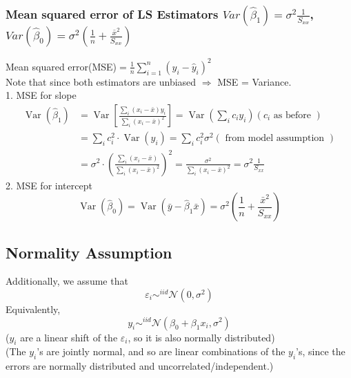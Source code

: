 \documentclass[11pt,a4paper]{article}
\begin{document}
\subsubsection{Mean squared error of LS Estimators $Var(\hat{\beta}_1)=\sigma^{2} \frac{1}{S_{x x}}$, $Var(\hat{\beta}_0)=\sigma^{2}\left(\frac{1}{n}+\frac{\bar{x}^{2}}{S_{x x}}\right)$}
Mean squared error(MSE)$= \frac{1}{n}\sum_{i=1}^n(y_i-\hat{y}_i)^2$\\
Note that since both estimators are unbiased $\Rightarrow$ MSE = Variance.\\
1. MSE for slope
\begin{equation}
    \begin{aligned}
        \operatorname{Var}\left(\hat{\beta}_{1}\right) &=\operatorname{Var}\left[\frac{\sum_{i}\left(x_{i}-\bar{x}\right) y_{i}}{\sum_{i}\left(x_{i}-\bar{x}\right)^{2}}\right]=\operatorname{Var}\left(\sum_{i} c_{i} y_{i}\right)\left(c_{i} \text { as before }\right) \\
        &=\sum_{i} c_{i}^{2} \cdot \operatorname{Var}\left(y_{i}\right)=\sum_{i} c_{i}^{2} \sigma^{2}(\text { from model assumption }) \\
        &=\sigma^{2} \cdot\left(\frac{\sum_{i}\left(x_{i}-\bar{x}\right)}{\sum_{i}\left(x_{i}-\bar{x}\right)^{2}}\right)^{2}=\frac{\sigma^{2}}{\sum_{i}\left(x_{i}-\bar{x}\right)^{2}}=\sigma^{2} \frac{1}{S_{x x}}
        \end{aligned}
    \nonumber
\end{equation}
2. MSE for intercept\\
\begin{equation}
    \operatorname{Var}\left(\hat{\beta}_{0}\right)=\operatorname{Var}\left(\bar{y}-\hat{\beta}_{1} \bar{x}\right)=\sigma^{2}\left(\frac{1}{n}+\frac{\bar{x}^{2}}{S_{x x}}\right)
    \nonumber
\end{equation}

\subsection{Normality Assumption}
Additionally, we assume that$$\varepsilon_i\sim^{iid}\mathcal{N}(0,\sigma^2)$$
Equivalently,$$y_i\sim^{iid}\mathcal{N}(\beta_0+\beta_1x_i,\sigma^2)$$
($y_i$ are a linear shift of the $\varepsilon_i$, so it is also normally distributed)\\
(The $y_i$’s are jointly normal, and so are linear combinations of the $y_i$’s, since the errors are normally distributed and uncorrelated/independent.)
\end{document}
